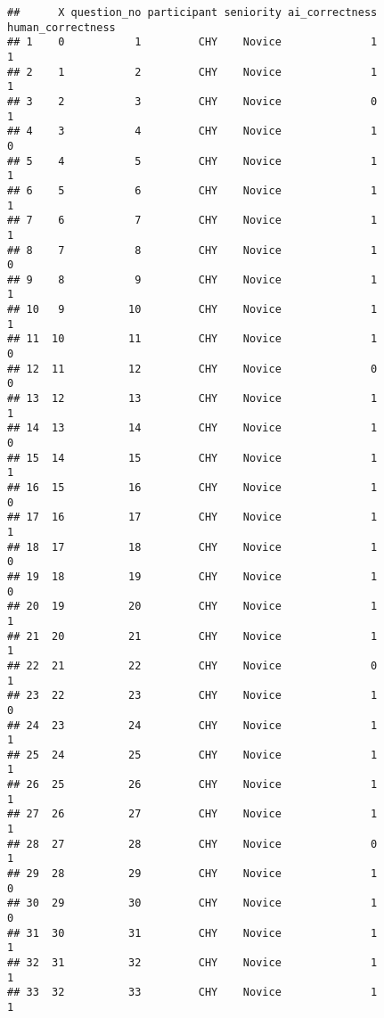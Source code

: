 \documentclass[
]{article}
\begin{document}
\begin{verbatim}
##      X question_no participant seniority ai_correctness human_correctness
## 1    0           1         CHY    Novice              1                 1
## 2    1           2         CHY    Novice              1                 1
## 3    2           3         CHY    Novice              0                 1
## 4    3           4         CHY    Novice              1                 0
## 5    4           5         CHY    Novice              1                 1
## 6    5           6         CHY    Novice              1                 1
## 7    6           7         CHY    Novice              1                 1
## 8    7           8         CHY    Novice              1                 0
## 9    8           9         CHY    Novice              1                 1
## 10   9          10         CHY    Novice              1                 1
## 11  10          11         CHY    Novice              1                 0
## 12  11          12         CHY    Novice              0                 0
## 13  12          13         CHY    Novice              1                 1
## 14  13          14         CHY    Novice              1                 0
## 15  14          15         CHY    Novice              1                 1
## 16  15          16         CHY    Novice              1                 0
## 17  16          17         CHY    Novice              1                 1
## 18  17          18         CHY    Novice              1                 0
## 19  18          19         CHY    Novice              1                 0
## 20  19          20         CHY    Novice              1                 1
## 21  20          21         CHY    Novice              1                 1
## 22  21          22         CHY    Novice              0                 1
## 23  22          23         CHY    Novice              1                 0
## 24  23          24         CHY    Novice              1                 1
## 25  24          25         CHY    Novice              1                 1
## 26  25          26         CHY    Novice              1                 1
## 27  26          27         CHY    Novice              1                 1
## 28  27          28         CHY    Novice              0                 1
## 29  28          29         CHY    Novice              1                 0
## 30  29          30         CHY    Novice              1                 0
## 31  30          31         CHY    Novice              1                 1
## 32  31          32         CHY    Novice              1                 1
## 33  32          33         CHY    Novice              1                 1

\end{verbatim}
\end{document}

